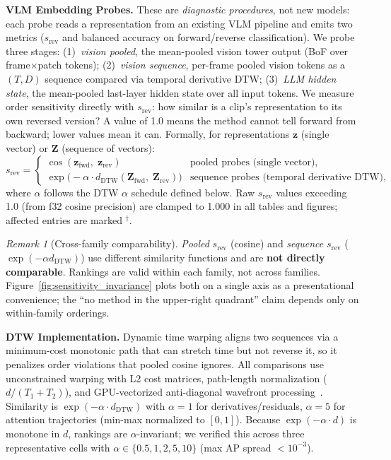 \documentclass{article}
\theoremstyle{remark}
\newtheorem{remark}{Remark}
\begin{document}
\textbf{VLM Embedding Probes.} These are \emph{diagnostic procedures}, not new models: each probe reads a representation from an existing VLM pipeline and emits two metrics ($s_\text{rev}$ and balanced accuracy on forward/reverse classification). We probe three stages: (1)~\emph{vision pooled}, the mean-pooled vision tower output (BoF over frame$\times$patch tokens); (2)~\emph{vision sequence}, per-frame pooled vision tokens as a $(T, D)$ sequence compared via temporal derivative DTW; (3)~\emph{LLM hidden state}, the mean-pooled last-layer hidden state over all input tokens. We measure order sensitivity directly with $s_\text{rev}$: how similar is a clip's representation to its own reversed version? A value of 1.0 means the method cannot tell forward from backward; lower values mean it can. Formally, for representations $\mathbf{z}$ (single vector) or $\mathbf{Z}$ (sequence of vectors):
\begin{equation}
s_\text{rev} =
\begin{cases}
\cos(\mathbf{z}_\text{fwd},\; \mathbf{z}_\text{rev}) & \text{pooled probes (single vector),} \\[4pt]
\exp\!\bigl(-\alpha \cdot d_\text{DTW}(\mathbf{Z}_\text{fwd},\; \mathbf{Z}_\text{rev})\bigr) & \text{sequence probes (temporal derivative DTW),}
\end{cases}
\label{eq:srev}
\end{equation}
where $\alpha$ follows the DTW $\alpha$ schedule defined below. Raw $s_\text{rev}$ values exceeding 1.0 (from f32 cosine precision) are clamped to 1.000 in all tables and figures; affected entries are marked $^\dagger$.
\begin{remark}[Cross-family comparability]
\emph{Pooled} $s_\text{rev}$ (cosine) and \emph{sequence} $s_\text{rev}$ ($\exp(-\alpha d_\text{DTW})$) use different similarity functions and are \textbf{not directly comparable}. Rankings are valid within each family, not across families. Figure~\ref{fig:sensitivity_invariance} plots both on a single axis as a presentational convenience; the ``no method in the upper-right quadrant'' claim depends only on within-family orderings.
\end{remark}

\textbf{DTW Implementation.} Dynamic time warping aligns two sequences via a minimum-cost monotonic path that can stretch time but not reverse it, so it penalizes order violations that pooled cosine ignores. All comparisons use unconstrained warping with L2 cost matrices, path-length normalization ($d / (T_1 + T_2)$), and GPU-vectorized anti-diagonal wavefront processing~\cite{ddtw}. Similarity is $\exp(-\alpha \cdot d_\text{DTW})$ with $\alpha = 1$ for derivatives/residuals, $\alpha = 5$ for attention trajectories (min-max normalized to $[0,1]$). Because $\exp(-\alpha \cdot d)$ is monotone in $d$, rankings are $\alpha$-invariant; we verified this across three representative cells with $\alpha \in \{0.5, 1, 2, 5, 10\}$ (max AP spread $< 10^{-3}$).
\end{document}
